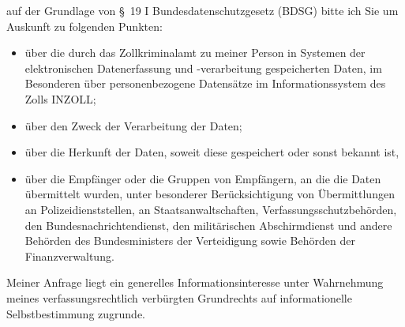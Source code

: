 auf der Grundlage von §~19 I Bundesdatenschutzgesetz (BDSG) bitte ich Sie um Auskunft
zu folgenden Punkten:

\begin{itemize}
  \item über die durch das Zollkriminalamt zu meiner Person in Systemen der elektronischen
  Datenerfassung und -verarbeitung gespeicherten Daten, im Besonderen über personenbezogene
  Datensätze im Informationssystem des Zolls INZOLL;

  \item über den Zweck der Verarbeitung der Daten;

  \item über die Herkunft der Daten, soweit diese gespeichert oder sonst bekannt ist,

  \item über die Empfänger oder die Gruppen von Empfängern, an die die Daten übermittelt
  wurden, unter besonderer Berücksichtigung von Übermittlungen an Polizeidienststellen,
  an Staatsanwaltschaften, Verfassungsschutzbehörden, den Bundesnachrichtendienst,
  den militärischen Abschirmdienst und andere Behörden des Bundesministers der
  Verteidigung sowie Behörden der Finanzverwaltung.
\end{itemize}

Meiner Anfrage liegt ein generelles Informationsinteresse unter Wahrnehmung
meines verfassungsrechtlich verbürgten Grundrechts auf informationelle
Selbstbestimmung zugrunde.
